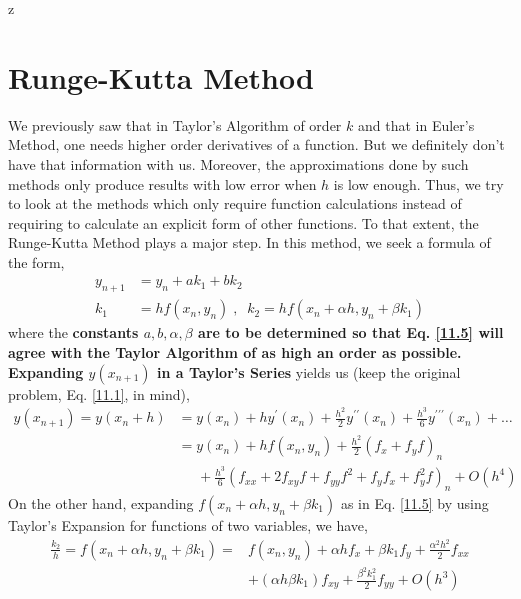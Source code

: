 z\documentclass[a4paper,12pt,twoside]{book}
\newcommand{\nll}[0]{\newline\newline}
\renewcommand{\d}[0]{\prime}
\begin{document}
\section{Runge-Kutta Method}
We previously saw that in Taylor's Algorithm of order $k$ and that in Euler's Method, one needs higher order derivatives of a function. But we definitely don't have that information with us. Moreover, the approximations done by such methods only produce results with low error when $h$ is low enough. Thus, we try to look at the methods which only require function calculations instead of requiring to calculate an explicit form of other functions.
\nll
To that extent, the Runge-Kutta Method plays a major step. In this method, we seek a formula of the form,
\begin{equation}
\label{11.5}
\begin{split}
    y_{n+1} &= y_n + ak_1 + bk_2\\
k_1 &= hf(x_n,y_n)\;,\;\; k_2 = hf(x_n + \alpha h,y_n + \beta k_1)
    \end{split}
\end{equation}
where the \textbf{constants $a,b,\alpha,\beta$ are to be determined so that Eq. \ref{11.5} will agree with the Taylor Algorithm of as high an order as possible.}
\nll
\textbf{Expanding $y(x_{n+1})$ in a Taylor's Series} yields us (keep the original problem, Eq. \ref{11.1}, in mind),
\begin{equation}
    \begin{split}
        y(x_{n+1}) = y(x_n + h) &= y(x_n) + hy^\d(x_n) + \frac{h^2}{2}y^{\d\d}(x_n) + \frac{h^3}{6}y^{\d\d\d}(x_n) + \dots\\
        &= y(x_n) + hf(x_n,y_n) + \frac{h^2}{2}(f_x + f_yf)_n \\
        &\;\;\;\;\; + \frac{h^3}{6}(f_{xx} + 2f_{xy}f + f_{yy}f^2 + f_yf_x + f_y^2f)_n + O(h^4)
    \end{split}
\end{equation}
On the other hand, expanding $f(x_n + \alpha h, y_n + \beta k_1)$ as in Eq. \ref{11.5} by using Taylor's Expansion for functions of two variables, we have,
\begin{equation}
\begin{split}
    \frac{k_2}{h} = f(x_n + \alpha h, y_n + \beta k_1) = &f(x_n, y_n) + \alpha h f_x + \beta k_1 f_y + \frac{\alpha^2 h^2}{2} f_{xx}\\
    &+ (\alpha h \beta k_1)f_{xy} + \frac{\beta^2 k_1^2}{2} f_{yy} + O(h^3)
\end{split}
\end{equation}
\end{document}
